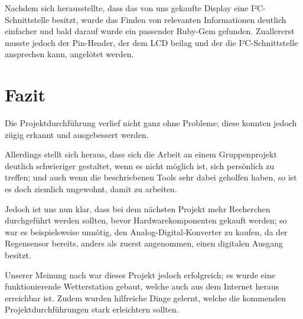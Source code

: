 \documentclass[a4paper,12pt]{article}
\begin{document}
Nachdem sich herausstellte, dass das von uns gekaufte Display eine I²C-Schnittstelle besitzt, wurde das Finden von relevanten Informationen deutlich einfacher und bald darauf wurde ein passender Ruby-Gem gefunden. Zuallererst musste jedoch der Pin-Header, der dem LCD beilag und der die I²C-Schnittstelle ansprechen kann, angelötet werden.

\pagebreak
\section{Fazit}
Die Projektdurchführung verlief nicht ganz ohne Probleme; diese konnten jedoch zügig erkannt und ausgebessert werden. 

Allerdings stellt sich heraus, dass sich die Arbeit an einem Gruppenprojekt deutlich schwieriger gestaltet, wenn es nicht möglich ist, sich persönlich zu treffen; und auch wenn die beschriebenen Tools sehr dabei geholfen haben, so ist es doch ziemlich ungewohnt, damit zu arbeiten.

Jedoch ist uns nun klar, dass bei dem nächsten Projekt mehr Recherchen durchgeführt werden sollten, bevor Hardwarekomponenten gekauft werden; so war es beispielsweise unnötig, den Analog-Digital-Konverter zu kaufen, da der Regensensor bereits, anders als zuerst angenommen, einen digitalen Ausgang besitzt.

Unserer Meinung nach war dieses Projekt jedoch erfolgreich; es wurde eine funktionierende Wetterstation gebaut, welche auch aus dem Internet heraus erreichbar ist. Zudem wurden hilfreiche Dinge gelernt, welche die kommenden Projektdurchführungen stark erleichtern sollten.
\end{document}
